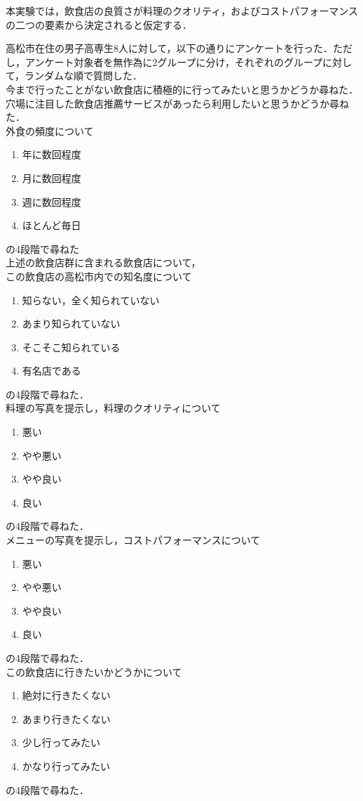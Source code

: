		本実験では，飲食店の良質さが料理のクオリティ，およびコストパフォーマンスの二つの要素から決定されると仮定する．\par
		高松市在住の男子高専生8人に対して，以下の通りにアンケートを行った．ただし，アンケート対象者を無作為に2グループに分け，それぞれのグループに対して，ランダムな順で質問した．\\
		今まで行ったことがない飲食店に積極的に行ってみたいと思うかどうか尋ねた．\\
		穴場に注目した飲食店推薦サービスがあったら利用したいと思うかどうか尋ねた．\\
		外食の頻度について
		\begin{enumerate}
			\item 年に数回程度
			\item 月に数回程度
			\item 週に数回程度
			\item ほとんど毎日
		\end{enumerate}
		の4段階で尋ねた\\
		上述の飲食店群に含まれる飲食店について，\\
		この飲食店の高松市内での知名度について
		\begin{enumerate}
			\item 知らない，全く知られていない
			\item あまり知られていない
			\item そこそこ知られている
			\item 有名店である
		\end{enumerate}
		の4段階で尋ねた．\\
		料理の写真を提示し，料理のクオリティについて
		\begin{enumerate}
			\item 悪い
			\item やや悪い
			\item やや良い
			\item 良い
		\end{enumerate}
		の4段階で尋ねた．\\
		メニューの写真を提示し，コストパフォーマンスについて
		\begin{enumerate}
			\item 悪い
			\item やや悪い
			\item やや良い
			\item 良い
		\end{enumerate}
		の4段階で尋ねた．\\
		この飲食店に行きたいかどうかについて
		\begin{enumerate}
			\item 絶対に行きたくない
			\item あまり行きたくない
			\item 少し行ってみたい
			\item かなり行ってみたい
		\end{enumerate}
		の4段階で尋ねた．\\

